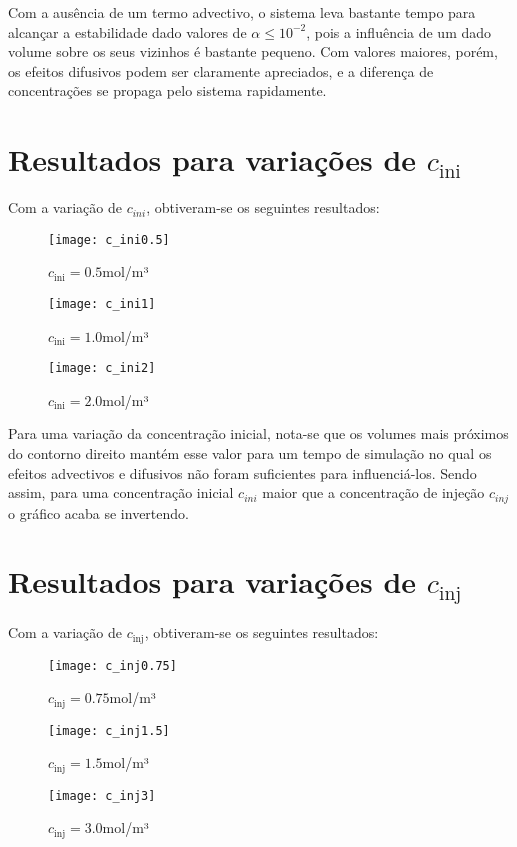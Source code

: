 Com a ausência de um termo advectivo, o sistema leva bastante tempo para
alcançar a estabilidade dado valores de $\alpha \leq 10^{-2}$, pois a
influência de um dado volume sobre os seus vizinhos é bastante pequeno. Com
valores maiores, porém, os efeitos difusivos podem ser claramente apreciados, e
a diferença de concentrações se propaga pelo sistema rapidamente.

\section{Resultados para variações de $c_\text{ini}$}
Com a variação de $c_{ini}$, obtiveram-se os seguintes resultados:
\begin{figure}[H]
    \centering
    \texttt{[image: c\_ini0.5]}
    \caption{$c_\text{ini} = 0.5$mol/m³}
\end{figure}
\begin{figure}[H]
    \centering
    \texttt{[image: c\_ini1]}
    \caption{$c_\text{ini} = 1.0$mol/m³}
\end{figure}
\begin{figure}[H]
    \centering
    \texttt{[image: c\_ini2]}
    \caption{$c_\text{ini} = 2.0$mol/m³}
\end{figure}

Para uma variação da concentração inicial, nota-se que os volumes mais
próximos do contorno direito mantém esse valor para um tempo de simulação no
qual os efeitos advectivos e difusivos não foram suficientes para
influenciá-los. Sendo assim, para uma concentração inicial $c_{ini}$ maior que
a concentração de injeção $c_{inj}$ o gráfico acaba se invertendo.

\section{Resultados para variações de $c_\text{inj}$}
Com a variação de $c_\text{inj}$, obtiveram-se os seguintes resultados:
\begin{figure}[H]
    \centering
    \texttt{[image: c\_inj0.75]}
    \caption{$c_\text{inj} = 0.75$mol/m³}
\end{figure}
\begin{figure}[H]
    \centering
    \texttt{[image: c\_inj1.5]}
    \caption{$c_\text{inj} = 1.5$mol/m³}
\end{figure}
\begin{figure}[H]
    \centering
    \texttt{[image: c\_inj3]}
    \caption{$c_\text{inj} = 3.0$mol/m³}
\end{figure}


